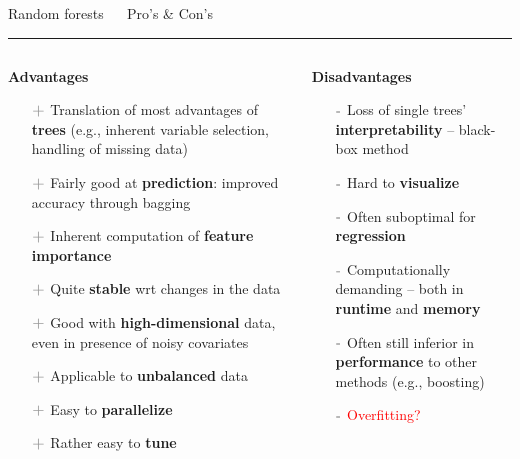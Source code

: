 \documentclass[11pt,compress,t,notes=noshow, xcolor=table]{beamer}
\begin{document}
\LARGE
\begin{frame}{\textcolor{gray!80}{Random forests} ~~ Pro's \& Con's}
\normalsize
\vspace{-0.5cm}
\noindent \textcolor{gray!80}{\rule{\textwidth}{1pt}}

\vspace{0.3cm}

\begin{columns}[onlytextwidth]
  \begin{column}{0.5\textwidth}
    \textbf{\textcolor{gray!80}{Advantages}}
    \footnotesize
    \begin{itemize}
      \item[$\textbf{\textcolor{gray!80}{+}}$] Translation of most advantages 
      of \textbf{trees} (e.g., inherent variable selection, handling of
      missing data)
      \item[$\textbf{\textcolor{gray!80}{+}}$] Fairly good at 
      \textbf{prediction}: improved accuracy through bagging
      \item[$\textbf{\textcolor{gray!80}{+}}$] Inherent computation of 
      \textbf{feature importance}
      \item[$\textbf{\textcolor{gray!80}{+}}$] Quite \textbf{stable} wrt changes 
      in the data
      \item[$\textbf{\textcolor{gray!80}{+}}$] Good with 
      \textbf{high-dimensional} data, even in presence of noisy covariates
      \item[$\textbf{\textcolor{gray!80}{+}}$] Applicable to \textbf{unbalanced} 
      data
      \item[$\textbf{\textcolor{gray!80}{+}}$] Easy to \textbf{parallelize}
      \item[$\textbf{\textcolor{gray!80}{+}}$] Rather easy to \textbf{tune}
    \end{itemize}
  \end{column}
  \begin{column}{0.5\textwidth}
    \textbf{\textcolor{gray!80}{Disadvantages}}
    \footnotesize
    \begin{itemize}
      \item[$\textbf{\textcolor{gray!80}{-}}$] Loss of single trees' 
      \textbf{interpretability} -- black-box method
      \item[$\textbf{\textcolor{gray!80}{-}}$] Hard to \textbf{visualize}
      \item[$\textbf{\textcolor{gray!80}{-}}$] Often suboptimal for 
      \textbf{regression}
      \item[$\textbf{\textcolor{gray!80}{-}}$] Computationally demanding --
      both in \textbf{runtime} and \textbf{memory}
      \item[$\textbf{\textcolor{gray!80}{-}}$] Often still inferior in
      \textbf{performance} to other methods (e.g., boosting)
      \item[$\textbf{\textcolor{gray!80}{-}}$] \textcolor{red}{Overfitting?}
    \end{itemize}
  \end{column}
\end{columns}


\end{frame}
\end{document}
